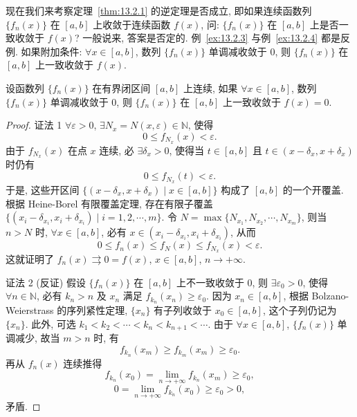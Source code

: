 现在我们来考察定理~\ref{thm:13.2.1} 的逆定理是否成立, 即如果连续函数列 $\{f_{n}(x)\}$ 在 $[a,b]$ 上收敛于连续函数 $f(x)$, 问: $\{f_{n}(x)\}$ 在 $[a,b]$ 上是否一致收敛于 $f(x)$? 一般说来, 答案是否定的. 例~\ref{ex:13.2.3} 与例~\ref{ex:13.2.4} 都是反例. 如果附加条件: $\forall x\in[a,b]$, 数列 $\{f_{n}(x)\}$ 单调减收敛于 $0$, 则 $\{f_{n}(x)\}$ 在 $[a,b]$ 上一致收敛于 $f(x)$.

\begin{theorem}[Dini]\label{thm:13.2.5}
设函数列 $\{f_{n}(x)\}$ 在有界闭区间 $[a,b]$ 上连续, 如果 $\forall x\in[a,b]$, 数列 $\{f_{n}(x)\}$ 单调减收敛于 $0$, 则 $\{f_{n}(x)\}$ 在 $[a,b]$ 上一致收敛于 $f(x)=0$.
\end{theorem}

\begin{proof}
证法 1 $\forall\varepsilon>0$, $\exists N_{x}=N(x,\varepsilon)\in\mathbb{N}$, 使得
\[
  0\leqslant f_{N_{x}}(x)<\varepsilon.
\]
由于 $f_{N_{x}}(x)$ 在点 $x$ 连续, 必 $\exists\delta_{x}>0$, 使得当 $t\in[a,b]$ 且 $t\in(x-\delta_{x},x+\delta_{x})$ 时仍有
\[
  0\leqslant f_{N_{x}}(t)<\varepsilon.
\]
于是, 这些开区间 $\{(x-\delta_{x},x+\delta_{x})\mid x\in[a,b]\}$ 构成了 $[a,b]$ 的一个开覆盖. 根据 Heine-Borel 有限覆盖定理, 存在有限子覆盖 $\{(x_{i}-\delta_{x_{i}},x_{i}+\delta_{x_{i}})\mid i=1,2,\cdots,m\}$. 令 $N=\max\{N_{x_{1}},N_{x_{2}},\cdots,N_{x_{m}}\}$, 则当 $n>N$ 时, $\forall x\in[a,b]$, 必有 $x\in(x_{i}-\delta_{x_{i}},x_{i}+\delta_{x_{i}})$, 从而
\[
  0\leqslant f_{n}(x)\leqslant f_{N}(x)\leqslant f_{N_{x}}(x)<\varepsilon.
\]
这就证明了 $f_{n}(x)\rightrightarrows0=f(x)$, $x\in[a,b]$, $n\to+\infty$.

证法 2 (反证) 假设 $\{f_{n}(x)\}$ 在 $[a,b]$ 上不一致收敛于 $0$, 则 $\exists\varepsilon_{0}>0$, 使得 $\forall n\in\mathbb{N}$, 必有 $k_{n}>n$ 及 $x_{n}$ 满足 $f_{k_{n}}(x_{n})\geqslant\varepsilon_{0}$. 因为 $x_{n}\in[a,b]$, 根据 Bolzano-Weierstrass 的序列紧性定理, $\{x_{n}\}$ 有子列收敛于 $x_{0}\in[a,b]$, 这个子列仍记为 $\{x_{n}\}$. 此外, 可选 $k_{1}<k_{2}<\cdots<k_{n}<k_{n+1}<\cdots$. 由于 $\forall x\in[a,b]$, $\{f_{n}(x)\}$ 单调减少, 故当 $m>n$ 时, 有
\[
  f_{k_{n}}(x_{m})\geqslant f_{k_{m}}(x_{m})\geqslant\varepsilon_{0}.
\]
再从 $f_{n}(x)$ 连续推得
\[
  f_{k_{n}}(x_{0})=\lim_{n\to+\infty}f_{k_{n}}(x_{m})\geqslant\varepsilon_{0},
\]
\[
  0=\lim_{n\to+\infty}f_{k_{n}}(x_{0})\geqslant\varepsilon_{0}>0,
\]
矛盾.
\end{proof}


